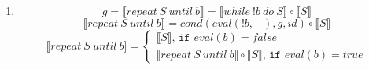 \documentclass[11pt]{article}
\begin{document}
\begin{enumerate}
	\item 
	\begin{equation*}
		g=\llbracket repeat\ S\ until\ b\rrbracket=\llbracket while\ !b\ do\ S\rrbracket\circ \llbracket S\rrbracket
	\end{equation*}
	\begin{equation*}
		\llbracket repeat\ S\ until\ b\rrbracket=cond(eval(!b,-), g, id)\circ \llbracket S\rrbracket
	\end{equation*}
	\begin{equation*}
		\llbracket repeat\ S\ until\ b] = \begin{cases}\llbracket S\rrbracket\texttt{, if }eval(b)=false \\ \llbracket repeat\ S\ until\ b\rrbracket\circ \llbracket S\rrbracket\texttt{, if }eval(b)=true\end{cases}
	\end{equation*}
		
	\end{enumerate}
\end{document}
